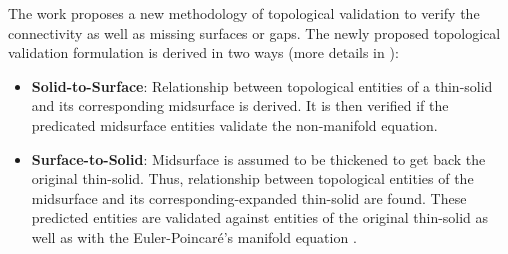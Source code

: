 The work proposes a new methodology of topological validation to verify the connectivity as well as missing surfaces or gaps. %
The newly proposed topological validation formulation is derived in two ways (more details in \cite{YogeshCADandA2015}):
\begin{itemize}
[noitemsep,topsep=2pt,parsep=2pt,partopsep=2pt]
\item \textbf{Solid-to-Surface}: Relationship between topological entities of a thin-solid and its corresponding midsurface is derived. It is then verified if the predicated midsurface entities validate the non-manifold equation\cite{Krishnamurti2002}.
\item  \textbf{Surface-to-Solid}: Midsurface is assumed to be thickened to get back the original thin-solid. Thus, relationship between topological entities of the midsurface and its corresponding-expanded thin-solid are found. These predicted entities are validated against entities of the original thin-solid as well as with the Euler-Poincar\'e's manifold equation \cite{Krishnamurti2002}.
\end{itemize}
